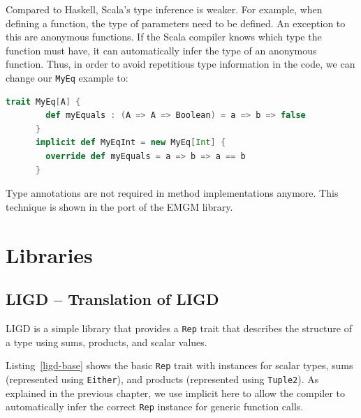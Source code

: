 \documentclass[abstracton,parskip=half]{scrreprt}
\newcommand{\cd}{\texttt}
\begin{document}
    Compared to Haskell, Scala's type inference is weaker. For example, when
    defining a function, the type of parameters need to be defined. An exception
    to this are anonymous functions. If the Scala compiler knows which type the
    function must have, it can automatically infer the type of an anonymous
    function. Thus, in order to avoid repetitious type information in the code,
    we can change our \cd{MyEq} example to:
    \begin{lstlisting}[language=Scala,gobble=6]
      trait MyEq[A] {
        def myEquals : (A => A => Boolean) = a => b => false
      }
      implicit def MyEqInt = new MyEq[Int] {
        override def myEquals = a => b => a == b
      }
    \end{lstlisting}
    Type annotations are not required in method implementations anymore. This
    technique is shown in the port of the EMGM library.

    \chapter{Libraries}

    \section{LIGD -- Translation of LIGD}
    

    LIGD is a simple library that provides a \cd{Rep} trait that describes
    the structure of a type using sums, products, and scalar values.

    Listing~\ref{ligd-base} shows the basic \cd{Rep} trait with instances for
    scalar types, sums (represented using \cd{Either}), and products (represented
    using \cd{Tuple2}). As explained in the previous chapter, we use implicit
    here to allow the compiler to automatically infer the correct \cd{Rep}
    instance for generic function calls.
\end{document}
